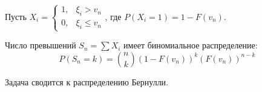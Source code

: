 \begin{example}
Пусть $X_i = \begin{cases} 1, & \xi_i > v_n \\ 0, & \xi_i \le v_n \end{cases}$, где $P(X_i = 1) = 1 - F(v_n)$.

Число превышений $S_n = \sum X_i$ имеет биномиальное распределение:
$$ P(S_n = k) = \binom{n}{k}(1 - F(v_n))^k (F(v_n))^{n-k} $$

Задача сводится к распределению Бернулли.
\end{example}

